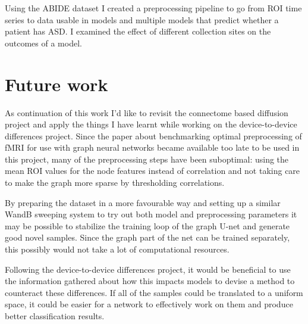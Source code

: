 Using the ABIDE dataset I created a preprocessing pipeline to go from ROI time series to data usable in models and multiple models that predict whether a patient has ASD. I examined the effect of different collection sites on the outcomes of a model.

\section{Future work}

As continuation of this work I'd like to revisit the connectome based diffusion project and apply the things I have learnt while working on the device-to-device differences project. Since the paper about benchmarking optimal preprocessing of fMRI for use with graph neural networks \cite{said2023neurograph} became available too late to be used in this project, many of the preprocessing steps have been suboptimal: using the mean ROI values for the node features instead of correlation and not taking care to make the graph more sparse by thresholding correlations.

By preparing the dataset in a more favourable way and setting up a similar WandB sweeping system to try out both model and preprocessing parameters it may be possible to stabilize the training loop of the graph U-net and generate good novel samples. Since the graph part of the net can be trained separately, this possibly would not take a lot of computational resources.

Following the device-to-device differences project, it would be beneficial to use the information gathered about how this impacts models to devise a method to counteract these differences. If all of the samples could be translated to a uniform space, it could be easier for a network to effectively work on them and produce better classification results.

